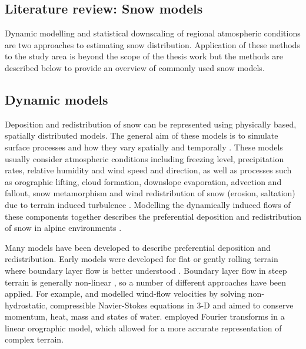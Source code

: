 \documentclass{sfuthesis}
\begin{document}
%
%
%
%
%

\backmatter%
	
	

\begin{appendices} 

\chapter{Literature review: Snow models }
\label{app:snow_models}

Dynamic modelling and statistical downscaling of regional atmospheric conditions are two approaches to estimating snow distribution. Application of these methods to the study area is beyond the scope of the thesis work but the methods are described below to provide an overview of commonly used snow models. 

\section{Dynamic models}

Deposition and redistribution of snow can be represented using physically based, spatially distributed models. The general aim of these models is to simulate surface processes and how they vary spatially and temporally \citep{Mott2008}. These models usually consider atmospheric conditions including freezing level, precipitation rates, relative humidity and wind speed and direction, as well as processes such as orographic lifting, cloud formation, downslope evaporation, advection and fallout, snow metamorphism and wind redistribution of snow (erosion, saltation) due to terrain induced turbulence \citep{Smith2004, Liston2006, Lehning2008, Mott2008}.  Modelling the dynamically induced flows of these components together describes the preferential deposition and redistribution of snow in alpine environments \citep{Lehning2008,Mott2008,Dadic2010}.

Many models have been developed to describe preferential deposition and redistribution. Early models were developed for flat or gently rolling terrain where boundary layer flow is better understood \citep{Dadic2010}. Boundary layer flow in steep terrain is generally non-linear \citep{Mott2008, Dadic2010}, so a number of different approaches have been applied.  For example, \cite{Dadic2010} and \cite{Lehning2008} modelled wind-flow velocities by solving non-hydrostatic, compressible Navier-Stokes equations in 3-D and aimed to conserve momentum, heat, mass and states of water. \cite{Smith2004} employed Fourier transforms in a linear orographic model, which allowed for a more accurate representation of complex terrain. 


\end{appendices}
\end{document}
